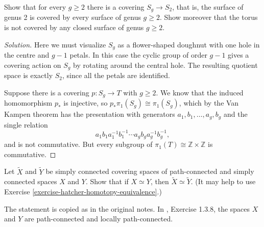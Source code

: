 \begin{exercise}
\label{exercise-covering-surfaces-genus}
Show that for every $g\geq2$ there is a
covering $S_g\to S_2$, that is, the surface
of genus 2 is covered by every surface of
genus $g\geq2$. Show moreover that the torus
is not covered by any closed surface of
genus $g\geq2$.
\end{exercise}

\begin{proof}[Solution]
Here we must visualize $S_g$ as a
flower-shaped doughnut with one hole in the
centre and $g-1$ petals. In this case the
cyclic group of order $g-1$ gives a covering
action on $S_g$ by rotating around the
central hole. The resulting quotient space
is exactly $S_2$, since all the petals are
identified.

Suppose there is a covering $p:S_g\to T$
with $g\geq2$. We know that the induced
homomorphism $p_*$ is injective, so
$p_*\pi_1(S_g)\cong\pi_1(S_g)$, which by the
Van Kampen theorem has the presentation with
generators $a_1,b_1,\ldots,a_g,b_g$ and the
single relation
$$
a_1b_1a_1^{-1}b_1^{-1}\cdots
a_gb_ga_g^{-1}b_g^{-1},
$$
and is not commutative. But every subgroup
of $\pi_1(T)\cong\mathbb{Z}\times\mathbb{Z}$
is commutative.
\end{proof}

\begin{exercise}[Hatcher 1.3.8]
\label{exercise-hatcher-covering-equivalence}
Let $\tilde{X}$ and $\tilde{Y}$ be simply
connected covering spaces of path-connected
and simply connected spaces $X$ and $Y$.
Show that if $X\simeq Y$, then
$\tilde{X}\simeq\tilde{Y}$. (It may help to
use Exercise
\ref{exercise-hatcher-homotopy-equivalence}.)
\end{exercise}

\begin{remark}
\label{remark-hatcher-covering-equivalence}
The statement is copied as in the original
notes. In \cite{hat}, Exercise 1.3.8, the
spaces $X$ and $Y$ are path-connected and
locally path-connected.
\end{remark}

